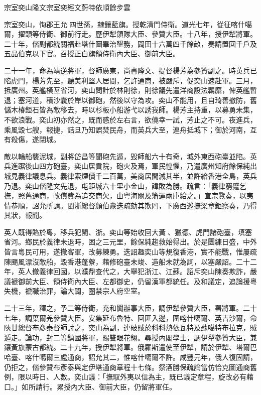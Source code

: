 
\begin{pinyinscope}
宗室奕山隆文宗室奕經文蔚特依順餘步雲

宗室奕山，恂郡王允四世孫，隸鑲藍旗。授乾清門侍衛。道光七年，從征喀什噶爾，擢頭等侍衛、御前行走。歷伊犁領隊大臣、參贊大臣。十八年，授伊犁將軍。二十年，偕副都統關福赴塔什圖畢治墾務，闢田十六萬四千餘畝，奏請置回千戶及五品伯克以下官。召授正白旗領侍衛內大臣、御前大臣。

二十一年，命為靖逆將軍，督師廣東，尚書隆文、提督楊芳為參贊副之。時英兵已陷虎門，楊芳先至，聽美利堅人居間，乞許通商，被嚴斥，促奕山速赴軍。三月，抵廣州。英艦橫亙省河，奕山問計於林則徐，則徐議先遣洋商設法羈縻，俾英艦暫退；塞河道，積沙囊於岸以御砲，然後以守為攻。奕山不能用，且自琦善撤防，舊儲木椿鉅石皆為敵移去，時以杉板小船游弋以誘我師。楊芳主持重，以募勇未集，不欲浪戰。奕山初亦然之，既而惑於左右言，欲僥幸一試，芳止之不可。夜進兵，乘風毀七艘，報捷，詰旦乃知誤焚民舟，而英兵大至，連舟抵城下；御於河南，互有殺傷，遂閉城。

敵以輪船襲泥城，副將岱昌等聞砲先遁，毀師船六十有奇，城外東西砲臺並陷。英兵進踞後山四方砲臺，奕山居貢院，砲火及焉，軍民惶懼，乃遣廣州知府餘保純出城見義律議息兵。義律索煙價千二百萬，美商居間減其半，並許給香港全島，英兵乃退。奕山偕隆文先退，屯距城六十里小金山，諱敗為勝。疏言：「義律窮蹙乞撫，照舊通商，改償費為追交商欠，由粵海關及籓運兩庫給之。」宣宗覽奏，以夷情恭順，詔允所請。閩浙總督顏伯燾迭疏劾其欺罔，下廣西巡撫梁章鉅察奏，乃得其狀，報聞。

英人既得賂於粵，移兵犯閩、浙。奕山等始收回大黃、獵德、虎門諸砲臺，填塞省河。鄉民於義律未退時，困之三元里，餘保純趨救始得出。於是團練日盛，中外皆言粵民可用，遂撤客軍，改募練勇。迭詔趣奕山等規復香港，實不能戰，惟屢疏陳颶風漂沒敵船，毀香港蓬藔，藉修砲臺未竣、造船未就為詞，以塞嚴詔。二十二年，英人撤義律回國，以濮鼎查代之，大舉犯浙江、江蘇。詔斥奕山陳奏欺詐，嚴議褫御前大臣、領侍衛內大臣、左都御史，仍留漢軍都統任。及和議定，追論援粵失機，褫職治罪，論大闢，圈禁宗人府空室。

二十三年，釋之，予二等侍衛，充和闐辦事大臣，調伊犁參贊大臣，署將軍。二十七年，調葉爾羌參贊大臣。安集延布魯特、回匪入邊，圍喀什噶爾、英吉沙爾，命陜甘總督布彥泰督師討之，奕山為副，連破賊於科科熱依瓦特及蘇噶特布拉克，賊遁走。論功，封二等鎮國將軍，賜雙眼花翎。尋授內閣學士，調伊犁參贊大臣，兼鑲黃旗蒙古都統。二十九年，授伊犁將軍。俄羅斯遣使至伊犁，請於伊犁、塔爾巴哈臺、喀什噶爾三處通商，詔允其二，惟喀什噶爾不許。咸豐元年，俄人復固請，仍拒之，偕參贊布彥泰與定伊塔通商章程十七條。祭酒勝保疏論當仿恰克圖通商舊例，限以時日、人數。奕山議：「撫馭外夷以信為主，既已議定章程，旋改必有藉口。」如所請行。累授內大臣、御前大臣，仍留將軍任。


\end{pinyinscope}
